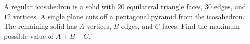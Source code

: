A regular icosahedron is a solid with $20$ equilateral triangle faces, $30$ edges, and $12$ vertices. A single plane cuts off a pentagonal pyramid from the icosahedron. The remaining solid has $A$ vertices, $B$ edges, and $C$ faces. Find the maximum possible value of $A+B+C$.
